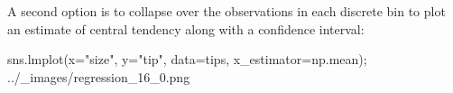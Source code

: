 \begin{frame}[fragile]
	\large
A second option is to collapse over the observations in each discrete bin to plot an estimate of central tendency along with a confidence interval:

sns.lmplot(x="size", y="tip", data=tips, x_estimator=np.mean);
../_images/regression_16_0.png

\end{frame}
